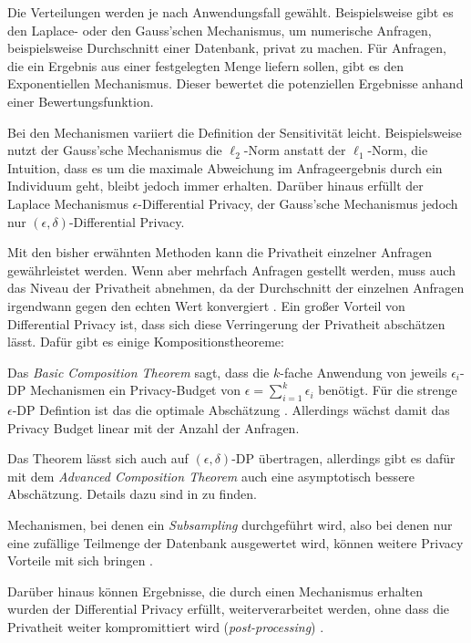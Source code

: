 Die Verteilungen werden je nach Anwendungsfall gewählt. Beispielsweise gibt es den Laplace- oder den Gauss'schen Mechanismus, um numerische Anfragen, beispielsweise Durchschnitt einer Datenbank, privat zu machen. Für Anfragen, die ein Ergebnis aus einer festgelegten Menge liefern sollen, gibt es den Exponentiellen Mechanismus. Dieser bewertet die potenziellen Ergebnisse anhand einer Bewertungsfunktion.\cite{mcsherry:2007}

Bei den Mechanismen variiert die Definition der Sensitivität leicht. Beispielsweise nutzt der Gauss'sche Mechanismus die $\ell_2$-Norm anstatt der $\ell_1$-Norm, die Intuition, dass es um die maximale Abweichung im Anfrageergebnis durch ein Individuum geht, bleibt jedoch immer erhalten. Darüber hinaus erfüllt der Laplace Mechanismus $\epsilon$-Differential Privacy, der Gauss'sche Mechanismus jedoch nur $(\epsilon, \delta)$-Differential Privacy.\cite[p.261ff]{dwork:2014}

Mit den bisher erwähnten Methoden kann die Privatheit einzelner Anfragen gewährleistet werden. Wenn aber mehrfach Anfragen gestellt werden, muss auch das Niveau der Privatheit abnehmen, da der Durchschnitt der einzelnen Anfragen irgendwann gegen den echten Wert konvergiert \cite[p.42]{dwork:2014}. Ein großer Vorteil von Differential Privacy ist, dass sich diese Verringerung der Privatheit abschätzen lässt. Dafür gibt es einige Kompositionstheoreme:

Das \textit{Basic Composition Theorem} sagt, dass die $k$-fache Anwendung von jeweils $\epsilon_i$-DP Mechanismen ein Privacy-Budget von $\epsilon = \sum_{i=1}^{k} \epsilon_i$ benötigt. Für die strenge $\epsilon$-DP Defintion ist das die optimale Abschätzung \cite{steinke:2022}. Allerdings wächst damit das Privacy Budget linear mit der Anzahl der Anfragen. 

Das Theorem lässt sich auch auf $(\epsilon, \delta)$-DP übertragen, allerdings gibt es dafür mit dem \textit{Advanced Composition Theorem} auch eine asymptotisch bessere Abschätzung. Details dazu sind in \textcite{dwork:2010, steinke:2022} zu finden.

Mechanismen, bei denen ein \textit{Subsampling} durchgeführt wird, also bei denen nur eine zufällige Teilmenge der Datenbank ausgewertet wird, können weitere Privacy Vorteile mit sich bringen \cite{mironov:2019, steinke:2022}.

Darüber hinaus können Ergebnisse, die durch einen Mechanismus erhalten wurden der Differential Privacy erfüllt, weiterverarbeitet werden, ohne dass die Privatheit weiter kompromittiert wird (\textit{post-processing}) \cite{dwork:2014}.

